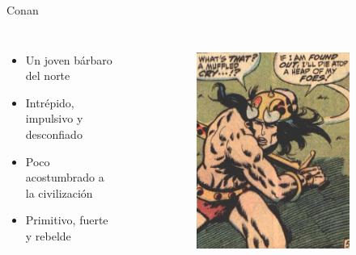 \begin{frame}{Conan}
	\begin{columns}
		\begin{itemize}
			\item Un joven bárbaro del norte
			\item Intrépido, impulsivo y desconfiado
			\item Poco acostumbrado a la civilización
			\item Primitivo, fuerte y rebelde
		\end{itemize}
		\begin{figure}[htp]
			\centering
			\begin{subfigure}[b]{0.3\textwidth}
				\includegraphics[width=\textwidth]{img/conan/CTB}
			\end{subfigure}
			~
			\begin{subfigure}[b]{0.27\textwidth}

\end{subfigure}
\end{figure}
\end{columns}
\end{frame}
